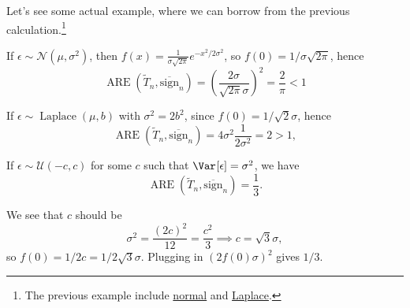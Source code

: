 Let's see some actual example, where we can borrow from the previous calculation.\footnote{The previous example include \hyperref[eg:ARE-normal]{normal} and \hyperref[eg:ARE-Laplace]{Laplace}.}

\begin{eg}[Gaussian]
	If \(\epsilon \sim \mathcal{N} (\mu , \sigma ^2)\), then \(f(x) = \frac{1}{\sigma \sqrt{2\pi } } e^{- x^2 / 2\sigma ^2}\), so \(f(0) = 1 / \sigma \sqrt{2\pi } \), hence
	\[
		\operatorname{ARE}(\widetilde{T} _n, \overline{\mathrm{sign}} _n)
		= \left( \frac{2\sigma }{\sqrt{2\pi } \sigma } \right) ^2
		= \frac{2}{\pi }
		< 1
	\]
\end{eg}

\begin{eg}[Laplace]
	If \(\epsilon \sim \operatorname{Laplace}(\mu , b) \) with \(\sigma ^2 = 2 b^2\), since \(f(0) = 1 /\sqrt{2} \sigma \), hence
	\[
		\operatorname{ARE}(\widetilde{T} _n, \overline{\mathrm{sign}} _n)
		= 4 \sigma ^2 \frac{1}{2 \sigma ^2}
		= 2
		> 1,
	\]
\end{eg}

\begin{eg}[Uniform]
	If \(\epsilon \sim \mathcal{U} (-c, c)\) for some \(c\) such that \(\Var_{}[\epsilon ] = \sigma ^2\), we have
	\[
		\operatorname{ARE}(\widetilde{T} _n, \overline{\mathrm{sign}} _n)
		= \frac{1}{3}.
	\]
\end{eg}
\begin{explanation}
	We see that \(c\) should be
	\[
		\sigma ^2
		= \frac{(2c)^2}{12}
		= \frac{c^2}{3}
		\implies c = \sqrt{3} \sigma ,
	\]
	so \(f(0) = 1 / 2c = 1 / 2 \sqrt{3} \sigma \). Plugging in \((2 f(0) \sigma )^2\) gives \(1 / 3\).
\end{explanation}

